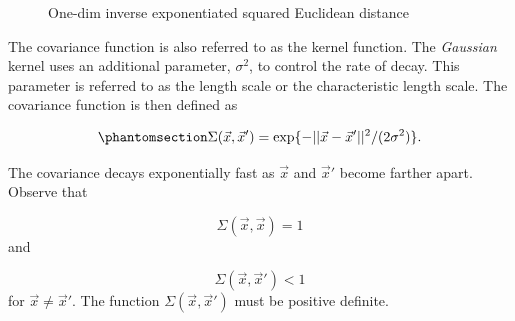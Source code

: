 \documentclass[
  letterpaper,
  DIV=11,
  numbers=noendperiod]{scrreprt}
\begin{document}
\begin{figure}[H]


\caption{\label{fig-exp2euclid}One-dim inverse exponentiated squared
Euclidean distance}

\end{figure}%

The covariance function is also referred to as the kernel function. The
\emph{Gaussian} kernel uses an additional parameter, \(\sigma^2\), to
control the rate of decay. This parameter is referred to as the length
scale or the characteristic length scale. The covariance function is
then defined as

\begin{equation}\phantomsection\label{eq-Sigma}{
\Sigma(\vec{x}, \vec{x}') = \exp\{ - || \vec{x} - \vec{x}'||^2 / (2 \sigma^2) \}.
}\end{equation}

The covariance decays exponentially fast as \(\vec{x}\) and \(\vec{x}'\)
become farther apart. Observe that

\[
\Sigma(\vec{x},\vec{x}) = 1
\] and

\[
\Sigma(\vec{x}, \vec{x}') < 1
\] for \(\vec{x} \neq \vec{x}'\). The function
\(\Sigma(\vec{x},\vec{x}')\) must be positive definite.
\end{document}
